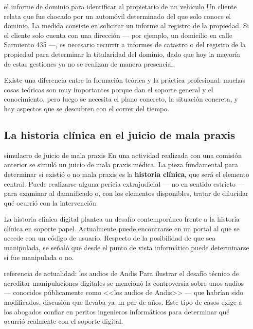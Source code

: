 \documentclass[12pt,oneside]{book}
\begin{document}
\begin{example}{el informe de dominio para identificar al propietario de un vehículo}
Un cliente relata que fue chocado por un automóvil determinado del que solo conoce el dominio. La medida consiste en solicitar un informe al registro de la propiedad. Si el cliente solo cuenta con una dirección --- por ejemplo, un domicilio en calle Sarmiento 435 ---, es necesario recurrir a informes de catastro o del registro de la propiedad para determinar la titularidad del dominio, dado que hoy la mayoría de estas gestiones ya no se realizan de manera presencial.
\end{example}

Existe una diferencia entre la formación teórica y la práctica profesional: muchas cosas teóricas son muy importantes porque dan el soporte general y el conocimiento, pero luego se necesita el plano concreto, la situación concreta, y hay aspectos que se descubren con el correr del tiempo.

\subsection{La historia clínica en el juicio de mala praxis}

\begin{example}{simulacro de juicio de mala praxis}
En una actividad realizada con una comisión anterior se simuló un juicio de mala praxis médica. La pieza fundamental para determinar si existió o no mala praxis es la \textbf{historia clínica}, que será el elemento central. Puede realizarse alguna pericia extrajudicial --- no en sentido estricto --- para examinar al damnificado o, con los elementos disponibles, tratar de dilucidar qué ocurrió con la intervención.
\end{example}

La historia clínica digital plantea un desafío contemporáneo frente a la historia clínica en soporte papel. Actualmente puede encontrarse en un portal al que se accede con un código de usuario. Respecto de la posibilidad de que sea manipulada, se señaló que desde el punto de vista informático puede determinarse si fue manipulada o no.

\begin{example}{referencia de actualidad: los audios de Andis}
Para ilustrar el desafío técnico de acreditar manipulaciones digitales se mencionó la controversia sobre unos audios --- conocidos públicamente como <<los audios de Andis>> --- que habrían sido modificados, discusión que llevaba ya un par de años. Este tipo de casos exige a los abogados confiar en peritos ingenieros informáticos para determinar qué ocurrió realmente con el soporte digital.
\end{example}
\end{document}
